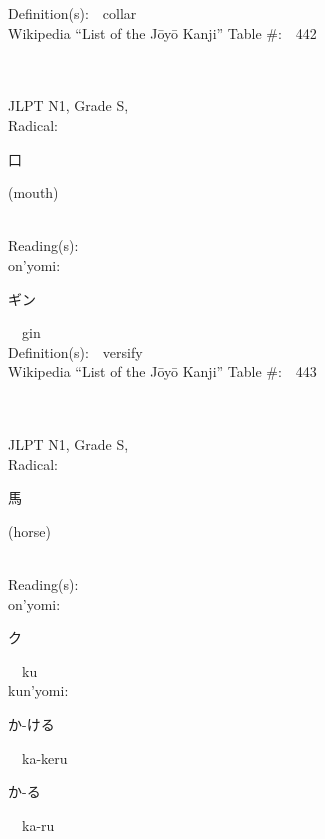 \begin{multicols}{2}
Definition(s):\ \ collar \\
Wikipedia ``List of the J\=oy\=o Kanji'' Table \#:\ \ 442 \\
\ \ \\
{\fontsize{34pt}{40pt}  }\ \ \\
{JLPT N1, Grade S, \\Radical:\ \ {\begin{CJK}{UTF8}{min} 口 \end{CJK}} (mouth) } \\
Reading(s):\ \ \\
{\hspace*{1em}}on'yomi:\ \ \\
{\hspace*{2em}}{\begin{CJK}{UTF8}{min} ギン \end{CJK}}\ \ gin\ \ \\
Definition(s):\ \ versify \\
Wikipedia ``List of the J\=oy\=o Kanji'' Table \#:\ \ 443 \\
\ \ \\
{\fontsize{34pt}{40pt}  }\ \ \\
{JLPT N1, Grade S, \\Radical:\ \ {\begin{CJK}{UTF8}{min} 馬 \end{CJK}} (horse) } \\
Reading(s):\ \ \\
{\hspace*{1em}}on'yomi:\ \ \\
{\hspace*{2em}}{\begin{CJK}{UTF8}{min} ク \end{CJK}}\ \ ku\ \ \\
{\hspace*{1em}}kun'yomi:\ \ \\
{\hspace*{2em}}{\begin{CJK}{UTF8}{min} か-ける \end{CJK}}\ \ ka-keru\ \ \\
{\hspace*{2em}}{\begin{CJK}{UTF8}{min} か-る \end{CJK}}\ \ ka-ru\ \ \\

\end{multicols}
